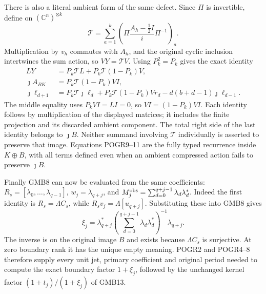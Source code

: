There is also a literal ambient form of the same defect. Since
$\Pi$ is invertible, define on $(\mathbb C^n)^{\otimes k}$
\[
 \mathcal T=\sum_{a=1}^k
 \left(\Pi\frac{A_h-\tfrac12 I}{i}\Pi^{-1}\right)_a.
 \tag{POGR12}
\]
Multiplication by $v_h$ commutes with $A_h$, and the original cyclic
inclusion intertwines the sum action, so $VY=\mathcal TV$.
Using $P_k^2=P_k$ gives the exact identity
\[
 \begin{split}
 LY&=P_k\mathcal T L+P_k\mathcal T(1-P_k)V,\\
 \jmath A_{BK}&=P_k\mathcal T(1-P_k)VI,\\
 \jmath\ell_{d+1}
 &=P_k\mathcal T\jmath\ell_d
   +P_k\mathcal T(1-P_k)Vr_d
   -d(b+d-1)\jmath\ell_{d-1}.
 \end{split}\tag{POGR13}
\]
The middle equality uses $P_kVI=LI=0$, so $VI=(1-P_k)VI$.
Each identity follows by multiplication of the displayed matrices;
it includes the finite projection and its discarded ambient component.
The total right side of the last identity belongs to $\jmath B$.
Neither summand involving $\mathcal T$ individually is asserted to
preserve that image. Equations POGR9--11 are the fully typed recurrence
inside $K\oplus B$, with all terms defined even when an ambient
compressed action fails to preserve $\jmath B$.

Finally GMB8 can now be evaluated from the same coefficients:
$R_s=[\lambda_0,\ldots,\lambda_{q-1}]$,
$w_j=\lambda_{q+j}$, and
$M_j^{\rm obs}=\sum_{d=0}^{q+j-1}\lambda_d\lambda_d^*$.
Indeed the first identity is $R_s=\Lambda C_s$, while
$R_sv_j=\Lambda[u_{q+j}]$. Substituting these into GMB8 gives
\[
 \xi_j=\lambda_{q+j}^*
   \left(\sum_{d=0}^{q+j-1}\lambda_d\lambda_d^*\right)^{-1}
   \lambda_{q+j}.
 \tag{POGR14}
\]
The inverse is on the original image $B$ and exists because
$\Lambda C_s$ is surjective. At zero boundary rank it has the unique
empty meaning. POGR2 and POGR4--8 therefore supply every unit jet,
primary coefficient and original period needed to compute the exact
boundary factor $1+\xi_j$, followed by the unchanged kernel factor
$(1+t_j)/(1+\xi_j)$ of GMB13.

